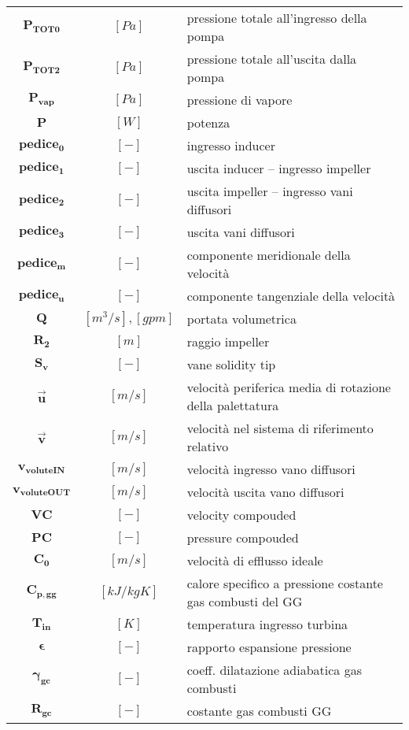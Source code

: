\begin{multicols}{2}
\begin{tabularx}{\linewidth}{cc>{\raggedright\arraybackslash}X}
		$\bm{P_{TOT 0}}$ & $[Pa]$ & pressione totale all'ingresso della pompa \\
        $\bm{P_{TOT 2}}$ & $[Pa]$ & pressione totale all'uscita dalla pompa \\
	    $\bm{P_{vap}}$ & $[Pa]$ & pressione di vapore \\
		$\bm{P}$ & $[W]$ & potenza \\
		$\bm{pedice_0}$ & $[-]$ & ingresso inducer \\
        $\bm{pedice_1}$ & $[-]$ & uscita inducer – ingresso impeller \\
        $\bm{pedice_2}$ & $[-]$ & uscita impeller – ingresso vani diffusori \\
		$\bm{pedice_3}$ & $[-]$ & uscita vani diffusori \\
		$\bm{pedice_m}$ & $[-]$ & componente meridionale della velocità \\
        $\bm{pedice_u}$ & $[-]$ & componente tangenziale della velocità \\
        $\bm{Q}$ & $[m^3/s], [gpm]$ & portata volumetrica \\
		$\bm{R_2}$ & $[m]$ & raggio impeller \\
		$\bm{S_v}$ & $[-]$ & vane solidity tip \\
        $\bm{\overrightarrow{u}}$ & $[m/s]$ & velocità periferica media di rotazione della palettatura \\
        $\bm{\overrightarrow{v}}$ & $[m/s]$ & velocità nel sistema di riferimento relativo \\
		$\bm{{v_{voluteIN}}}$ & $[m/s]$ & velocità ingresso vano diffusori \\
		$\bm{{v_{voluteOUT}}}$ & $[m/s]$ & velocità uscita vano diffusori \\
		$\bm{VC}$ & $[-]$ & velocity compouded\\
		$\bm{PC}$ & $[-]$ & pressure compouded\\
		$\bm{C_0}$ & $[m/s]$ & velocità di efflusso ideale\\
		$\bm{C_{p,gg}}$ & $[kJ/kgK]$ & calore specifico a pressione costante gas combusti del GG\\
		$\bm{T_{in}}$ & $[K]$ & temperatura ingresso turbina\\
		$\bm{\epsilon}$ & $[-]$ & rapporto espansione pressione\\
		$\bm{\gamma_{gc}}$ & $[-]$ & coeff. dilatazione adiabatica gas combusti \\
		$\bm{R_{gc}}$ & $[-]$ & costante gas combusti GG \\

\end{tabularx}
\end{multicols}
